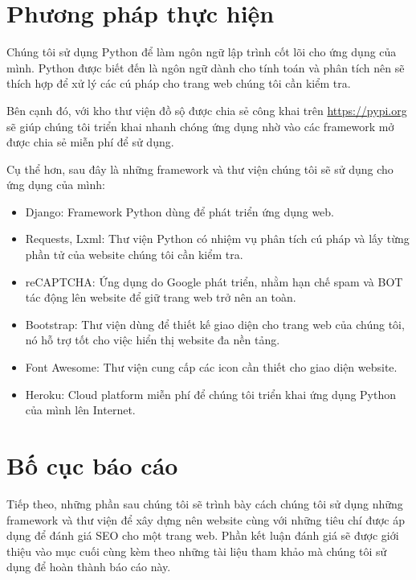 \section{Phương pháp thực hiện}
Chúng tôi sử dụng Python để làm ngôn ngữ lập trình cốt lõi cho ứng dụng của mình. Python được biết đến là ngôn ngữ dành cho tính toán và phân tích nên sẽ thích hợp để xử lý các cú pháp cho trang web chúng tôi cần kiểm tra.
\par
Bên cạnh đó, với kho thư viện đồ sộ được chia sẻ công khai trên \url{https://pypi.org} sẽ giúp chúng tôi triển khai nhanh chóng ứng dụng nhờ vào các framework mở được chia sẻ miễn phí để sử dụng.
\par
Cụ thể hơn, sau đây là những framework và thư viện chúng tôi sẽ sử dụng cho ứng dụng của mình:
\begin{itemize}
	\item Django: Framework Python dùng để phát triển ứng dụng web.
	\item Requests, Lxml: Thư viện Python có nhiệm vụ phân tích cú pháp và lấy từng phần tử của website chúng tôi cần kiểm tra.
	\item reCAPTCHA: Ứng dụng do Google phát triển, nhằm hạn chế spam và BOT tác động lên website để giữ trang web trở nên an toàn.
	\item Bootstrap: Thư viện dùng để thiết kế giao diện cho trang web của chúng tôi, nó hỗ trợ tốt cho việc hiển thị website đa nền tảng.
	\item Font Awesome: Thư viện cung cấp các icon cần thiết cho giao diện website.
	\item Heroku: Cloud platform miễn phí để chúng tôi triển khai ứng dụng Python của mình lên Internet.
\end{itemize}
\section{Bố cục báo cáo}
Tiếp theo, những phần sau chúng tôi sẽ trình bày cách chúng tôi sử dụng những framework và thư viện để xây dựng nên website cùng với những tiêu chí được áp dụng để đánh giá SEO cho một trang web. Phần kết luận đánh giá sẽ được giới thiệu vào mục cuối cùng kèm theo những tài liệu tham khảo mà chúng tôi sử dụng để hoàn thành báo cáo này.